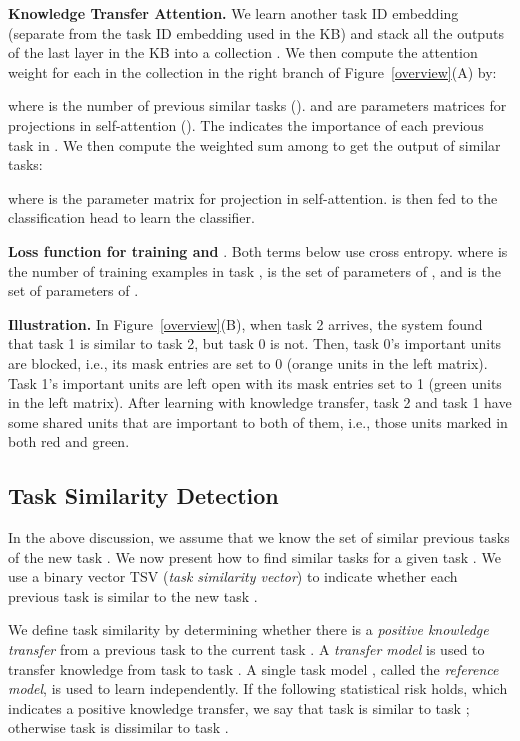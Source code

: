 \documentclass{article}
\begin{document}
\textbf{Knowledge Transfer Attention.} We learn another task ID embedding (separate from the task ID embedding used in the KB)  and stack all the outputs of the last layer in the KB  into a collection . We then compute the attention weight for each  in the collection in the right branch of Figure~\ref{overview}(A) by:

where  is the number of previous similar tasks ().  and  are parameters matrices for projections in self-attention (\cite{vaswani2017attention}). The  indicates the importance of each previous task in . We then compute the weighted sum among  to get the output of similar tasks:

where  is the parameter matrix for projection in self-attention.  is then fed to the  classification head to learn the classifier.

\textbf{Loss function for training  and }. Both terms below use cross entropy. 
where  is the number of training examples in task ,  is the set of parameters of , and  is the set of parameters of . 



\textbf{Illustration.} 
In Figure~\ref{overview}(B), when task 2 arrives, the system found that task 1 is similar to task 2, but task 0 is not. Then, task 0's important units are blocked, i.e., its mask entries are set to 0 (orange units in the left matrix). Task 1's important units are left open with its mask entries set to 1 (green units in the left matrix). After learning with knowledge transfer, task 2 and task 1 have some shared units that are important to both of them, i.e., those units marked in both red and green. 



\subsection{Task Similarity Detection}
\label{tsv}

In the above discussion, we assume that we know the set of similar previous tasks  of the new task . We now present how to find similar tasks for a given task . We use a binary vector TSV (\textit{task similarity vector}) to indicate whether each previous task  is similar to the new task . 

We define task similarity by determining whether there is a \textit{positive knowledge transfer} from a previous task  to the current task . A \textit{transfer model}  is used to transfer knowledge from task  to task . A single task model , called the \textit{reference model}, is used to learn  independently. If the following statistical risk holds, which indicates a positive knowledge transfer, we say that task  is similar to task ; otherwise task  is dissimilar to task . 
\end{document}
